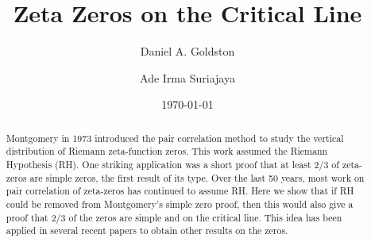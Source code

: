 \documentclass[11pt]{amsart}
\title[Zeta Zeros on the Critical Line ]{Zeta Zeros on the Critical Line }
\author[Goldston]{Daniel A. Goldston}
\author[Suriajaya]{Ade Irma Suriajaya}
\theoremstyle{remark}
\theoremstyle{plain}
\numberwithin{equation}{section}
\begin{document}

\begin{abstract}
Montgomery in 1973 introduced the pair correlation method to study the vertical distribution of Riemann zeta-function zeros. This work assumed the Riemann Hypothesis (RH). One striking application was a short proof that at least 2/3 of zeta-zeros are simple zeros, the first result of its type. Over the last 50 years, most work on pair correlation of zeta-zeros has continued to assume RH. Here we show that if RH could be removed from Montgomery's simple zero proof, then this would also give a proof that 2/3 of the zeros are simple and on the critical line. This idea has been applied in several recent papers to obtain other results on the zeros. 



\end{abstract}
\date{\today}

\maketitle
\end{document}
